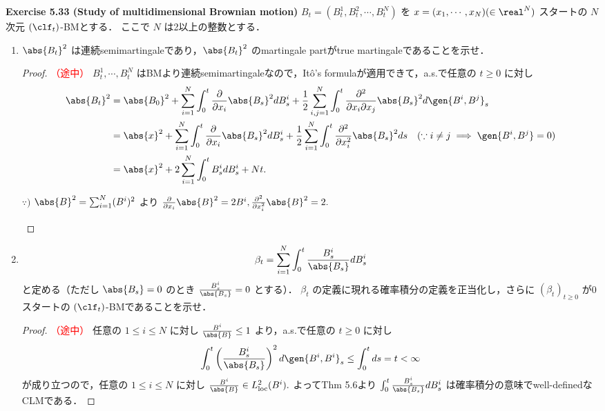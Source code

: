 \documentclass{jsarticle}
\begin{document}
\textbf{Exercise 5.33 (Study of multidimensional Brownian motion)}
$B_t=(B_t^{1},B_t^{2},\dotsb,B_t^{N})$ を $x=(x_1,\dotsb,x_N)(\in\real^N)$ スタートの $N$ 次元 $(\clf_t)$-BMとする．
ここで $N$ は2以上の整数とする．
\begin{enumerate}
    \item
    $\abs{B_t}^2$ は連続semimartingaleであり，$\abs{B_t}^2$ のmartingale partがtrue martingaleであることを示せ．
    \begin{proof}\textcolor{red}{（途中）}
        $B_t^{1},\dotsb,B_t^{N}$ はBMより連続semimartingaleなので，It\^{o}'s formulaが適用できて，a.s.で任意の $t\ge0$ に対し
        \begin{align}
            \abs{B_t}^2
            &= \abs{B_0}^2
            + \sum_{i=1}^{N}\int_{0}^{t}\frac{\partial}{\partial x_i}\abs{B_s}^2 dB_s^i
            + \frac{1}{2}\sum_{i,j=1}^{N}\int_{0}^{t}\frac{\partial^2}{\partial x_i\partial x_j}\abs{B_s}^2 d\gen{B^i,B^j}_s \\
            &= \abs{x}^2
            + \sum_{i=1}^{N}\int_{0}^{t}\frac{\partial}{\partial x_i}\abs{B_s}^2 dB_s^i
            + \frac{1}{2}\sum_{i=1}^{N}\int_{0}^{t}\frac{\partial^2}{\partial x_i^2}\abs{B_s}^2 ds
            \quad(\because i\neq j\implies\gen{B^i,B^j}=0)\\
            &= \abs{x}^2
            + 2\sum_{i=1}^{N}\int_{0}^{t}B_s^i dB_s^i
            + Nt.
        \end{align}
        \begin{screen}
            $\because)$ $\abs{B}^2=\sum_{i=1}^{N}(B^i)^2$ より $\frac{\partial}{\partial x_i}\abs{B}^2=2B^i, \frac{\partial^2}{\partial x_i^2}\abs{B}^2=2.$
        \end{screen}
    \end{proof}
    
    \item
    \begin{align}
        \beta_t
        = \sum_{i=1}^{N}\int_{0}^{t}\frac{B_{s}^{i}}{\abs{B_s}}dB_s^i
    \end{align}
    と定める（ただし $\abs{B_s}=0$ のとき $\frac{B_{s}^{i}}{\abs{B_s}}=0$ とする）．
    $\beta_t$ の定義に現れる確率積分の定義を正当化し，さらに $(\beta_t)_{t\ge0}$ が0スタートの $(\clf_t)$-BMであることを示せ．
    \begin{proof}\textcolor{red}{（途中）}
        任意の $1\le i\le N$ に対し $\frac{B^i}{\abs{B}}\le1$ より，a.s.で任意の $t\ge0$ に対し
        \begin{align}
            \int_0^t \left(\frac{B_s^i}{\abs{B_s}}\right)^2 d\gen{B^i, B^i}_s
            \le \int_0^t ds = t < \infty
        \end{align}
        が成り立つので，任意の $1\le i\le N$ に対し $\frac{B^i}{\abs{B}}\in L_{\mathrm{loc}}^2(B^i).$
        よってThm 5.6より $\int_{0}^{t}\frac{B_{s}^{i}}{\abs{B_s}}dB_s^i$ は確率積分の意味でwell-definedなCLMである．


\end{proof}
\end{enumerate}
\end{document}
